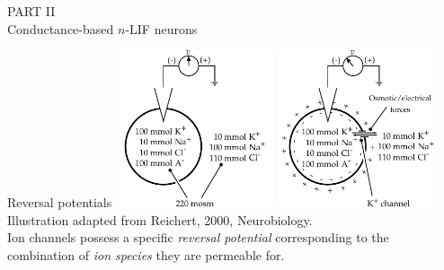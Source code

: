 \documentclass[aspectratio=169]{beamer}
\renewcommand{\emph}[1]{{\color{violet}\textit{#1}}}
\begin{document}
\begin{frame}
\centering
\Large\textsc{PART II}\\[0.5cm]
{\huge\color{violet}Conductance-based $n$-LIF neurons}
\end{frame}

\begin{frame}{Reversal potentials}
	\centering
	\includegraphics[width=0.35\textwidth]{media/neuron_channel_a.pdf}\hspace{1cm}
	\includegraphics[width=0.35\textwidth]{media/neuron_channel_b.pdf}\\[0.25cm]
	{\color{aluminium4}\footnotesize Illustration adapted from Reichert, 2000, Neurobiology.}\\[0.5cm]
	Ion channels possess a specific \emph{reversal potential} corresponding to the\\
	combination of \emph{ion species} they are permeable for.
\end{frame}
\end{document}
